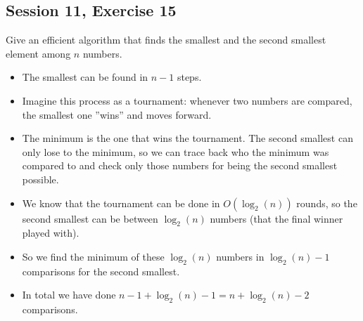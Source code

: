 \subsection {Session 11, Exercise 15}


Give an efficient algorithm that finds the smallest and the second smallest element among $n$ numbers.


\begin{itemize}
    \item The smallest can be found in $n-1$ steps.
    \item Imagine this process as a tournament: whenever two numbers are compared, the smallest one ''wins'' and moves forward.
    \item The minimum is the one that wins the tournament. The second smallest can only lose to the minimum, so we can trace back who the minimum was compared to and check only those numbers for being the second smallest possible.
    \item We know that the tournament can be done in $O(\log_2(n))$ rounds, so the second smallest can be between $\log_2(n)$ numbers (that the final winner played with).
    \item So we find the minimum of these $\log_2(n)$ numbers in $\log_2(n)-1$ comparisons for the second smallest.
    \item In total we have done $n-1+\log_2(n)-1 = n+\log_2(n)-2$ comparisons.
\end{itemize}


